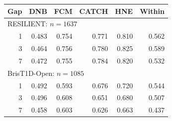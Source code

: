 \begin{tabular*}{\linewidth}{@{\extracolsep{\fill}}rrrrrr@{}}
\toprule
Gap & DNB & FCM & CATCH & HNE & Within \\
\midrule
\multicolumn{6}{l}{RESILIENT: $n=1637$} \\
\midrule
1 & 0.483 & 0.754 & 0.771 & 0.810 & 0.562 \\
3 & 0.464 & 0.756 & 0.780 & 0.825 & 0.589 \\
7 & 0.472 & 0.755 & 0.784 & 0.820 & 0.532 \\
\midrule
\multicolumn{6}{l}{BrisT1D-Open: $n=1085$} \\
\midrule
1 & 0.492 & 0.593 & 0.676 & 0.720 & 0.544 \\
3 & 0.496 & 0.608 & 0.651 & 0.680 & 0.507 \\
7 & 0.458 & 0.603 & 0.626 & 0.663 & 0.437 \\
\bottomrule
\end{tabular*}